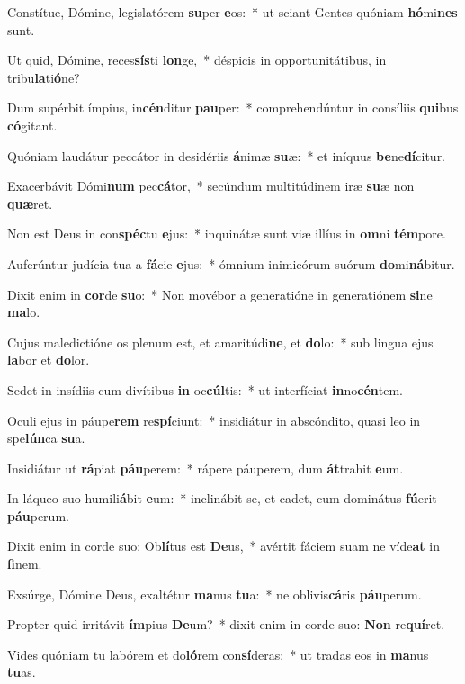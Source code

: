 \item Constítue, Dómine, legislatórem \textbf{su}per \textbf{e}os:~* ut sciant Gentes quóniam \textbf{hó}mi\textbf{nes} sunt.
\item Ut quid, Dómine, reces\textbf{sís}ti \textbf{lon}ge,~* déspicis in opportunitátibus, in tribu\textbf{la}ti\textbf{ó}ne?
\item Dum supérbit ímpius, in\textbf{cén}ditur \textbf{pau}per:~* comprehendúntur in consíliis \textbf{qui}bus \textbf{có}gitant.
\item Quóniam laudátur peccátor in desidériis \textbf{á}nimæ \textbf{su}æ:~* et iníquus \textbf{be}ne\textbf{dí}citur.
\item Exacerbávit Dómi\textbf{num} pec\textbf{cá}tor,~* secúndum multitúdinem iræ \textbf{su}æ non \textbf{quæ}ret.
\item Non est Deus in con\textbf{spéc}tu \textbf{e}jus:~* inquinátæ sunt viæ illíus in \textbf{om}ni \textbf{tém}pore.
\item Auferúntur judícia tua a \textbf{fá}cie \textbf{e}jus:~* ómnium inimicórum suórum \textbf{do}mi\textbf{ná}bitur.
\item Dixit enim in \textbf{cor}de \textbf{su}o:~* Non movébor a generatióne in generatiónem \textbf{si}ne \textbf{ma}lo.
\item Cujus maledictióne os plenum est, et amaritúdi\textbf{ne}, et \textbf{do}lo:~* sub lingua ejus \textbf{la}bor et \textbf{do}lor.
\item Sedet in insídiis cum divítibus \textbf{in} oc\textbf{cúl}tis:~* ut interfíciat \textbf{in}no\textbf{cén}tem.
\item Oculi ejus in páupe\textbf{rem} re\textbf{spí}ciunt:~* insidiátur in abscóndito, quasi leo in spe\textbf{lún}ca \textbf{su}a.
\item Insidiátur ut \textbf{rá}piat \textbf{páu}perem:~* rápere páuperem, dum \textbf{át}trahit \textbf{e}um.
\item In láqueo suo humili\textbf{á}bit \textbf{e}um:~* inclinábit se, et cadet, cum dominátus \textbf{fú}erit \textbf{páu}perum.
\item Dixit enim in corde suo: Ob\textbf{lí}tus est \textbf{De}us,~* avértit fáciem suam ne víde\textbf{at} in \textbf{fi}nem.
\item Exsúrge, Dómine Deus, exaltétur \textbf{ma}nus \textbf{tu}a:~* ne oblivis\textbf{cá}ris \textbf{páu}perum.
\item Propter quid irritávit \textbf{ím}pius \textbf{De}um?~* dixit enim in corde suo: \textbf{Non} re\textbf{quí}ret.
\item Vides quóniam tu labórem et do\textbf{ló}rem con\textbf{sí}deras:~* ut tradas eos in \textbf{ma}nus \textbf{tu}as.
